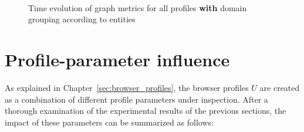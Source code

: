 \begin{figure}
  \centering
   \hfill
   \\

  \caption{Time evolution of graph metrics for all profiles \textbf{with} domain grouping according to entities}
  \label{fig:metrics_with_entities}
  \end{figure}



\section{Profile-parameter influence}
As explained in Chapter~\ref{sec:browser_profiles}, the browser profiles $U$ are created as a combination of different profile parameters under inspection. After a thorough examination of the experimental results of the previous sections, the impact of these parameters can be summarized as follows:

